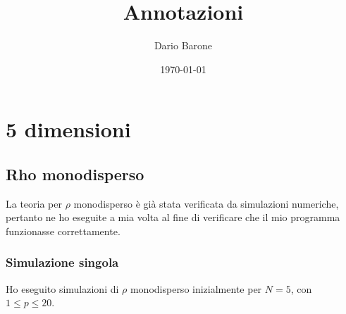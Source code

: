 \documentclass[a4paper,12pt,twoside,openright]{report}
\title{Annotazioni}
\author{Dario Barone}
\date{\today}
\begin{document}
\maketitle
\tableofcontents
\clearpage

\section{5 dimensioni}
\label{sec:5dim}

\subsection{Rho monodisperso}
\label{subsec:5dimrhomono}
La teoria per $ \rho $ monodisperso è già stata verificata da simulazioni numeriche, pertanto ne ho eseguite a mia volta al fine di verificare che il mio programma funzionasse correttamente.
\subsubsection{Simulazione singola}
\label{subsubsec:5dimrhomonosingle}
Ho eseguito simulazioni di $ \rho $ monodisperso inizialmente per $ N = 5 $, con $ 1 \le p \le 20 $.
\end{document}

